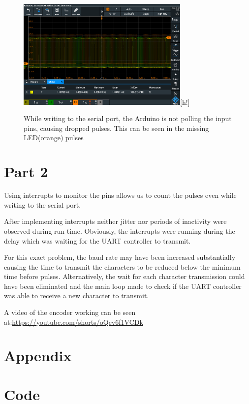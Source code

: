 \documentclass{article}
\begin{document}
\begin{figure}[h]
    \centering
    \includegraphics[width=0.75\textwidth]{Project1RotaryEncoder/oscilloscope_missing_pulses.PNG}[h!]
    \caption{While writing to the serial port, the Arduino is not polling the input pins, causing dropped pulses. This can be seen in the missing LED(orange) pulses}
    \label{fig:oscdrop}
\end{figure}


\section*{Part 2}
Using interrupts to monitor the pins allows us to count the pulses even while writing to the serial port.

After implementing interrupts neither jitter nor periods of inactivity were observed during run-time. Obviously, the interrupts were running during the delay which was waiting for the UART controller to transmit. 

For this exact problem, the baud rate may have been increased substantially causing the time to transmit the characters to be reduced below the minimum time before pulses. Alternatively, the wait for each character transmission could have been eliminated and the main loop made to check if the UART controller was able to receive a new character to transmit.


A video of the encoder working can be seen at:\newline  \url{https://youtube.com/shorts/oQev6f1VCDk}
\newpage
\section*{Appendix}
\appendix
\section{Code}\label{appendix:code}






\end{document}
